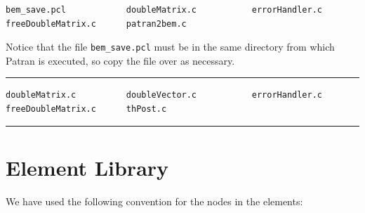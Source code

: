 \documentclass[12pt]{article}
\begin{document}
\small\begin{verbatim}
bem_save.pcl            doubleMatrix.c           errorHandler.c
freeDoubleMatrix.c      patran2bem.c
\end{verbatim}\normalsize

Notice that the file \verb+bem_save.pcl+ must be in the same directory from which Patran is executed, so copy the file over as necessary.

\vspace{12pt}\hrule


\small\begin{verbatim}
doubleMatrix.c          doubleVector.c           errorHandler.c
freeDoubleMatrix.c      thPost.c
\end{verbatim}\normalsize

\hrule

\pagebreak
\section{Element Library}
We have used the following convention for the nodes in the elements:
\end{document}
